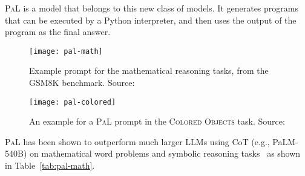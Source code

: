 \textsc{PaL} is a model that belongs to this new class of models.
It generates programs that can be executed by a Python interpreter, and then uses the output of the program as the final answer.
\begin{figure}[h!]
	\centering
	\texttt{[image: pal-math]}
	\caption{Example prompt for the mathematical reasoning tasks, from the GSM8K benchmark. Source: \textcite{gao2022pal}}
	\label{fig:pal-math}
\end{figure}
\begin{figure}[h!]
	\centering
	\texttt{[image: pal-colored]}
	\caption{An example for a \textsc{PaL} prompt in the \textsc{Colored Objects} task. Source: \textcite{gao2022pal}}
	\label{fig:pal-colored}
\end{figure}
\textsc{PaL} has been shown to outperform much larger LLMs using CoT (e.g., PaLM-540B) on mathematical word problems and symbolic reasoning tasks~\cite{gao2022pal} as shown in Table~\ref{tab:pal-math}.
